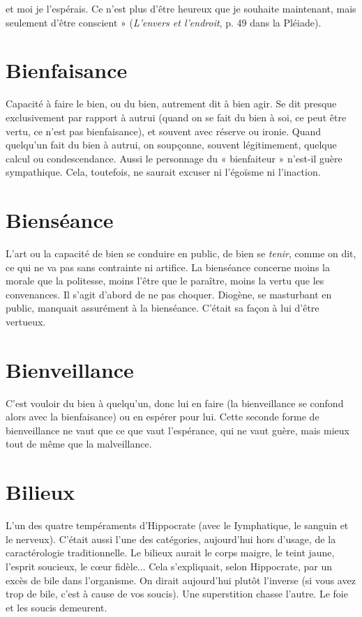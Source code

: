 et moi je l’espérais. Ce n’est plus d’être heureux que je souhaite maintenant,
mais seulement d’être conscient » ({\it L'envers et l'endroit}, p. 49 dans la Pléiade).

\section{Bienfaisance}
Capacité à faire le bien, ou du bien, autrement dit à bien
agir. Se dit presque exclusivement par rapport à autrui
(quand on se fait du bien à soi, ce peut être vertu, ce n’est pas bienfaisance), et
souvent avec réserve ou ironie. Quand quelqu'un fait du bien à autrui, on
soupçonne, souvent légitimement, quelque calcul ou condescendance. Aussi le
personnage du « bienfaiteur » n’est-il guère sympathique. Cela, toutefois, ne
saurait excuser ni l’égoïsme ni l’inaction.

\section{Bienséance}
L’art ou la capacité de bien se conduire en public, de bien se
{\it tenir}, comme on dit, ce qui ne va pas sans contrainte ni artifice.
La bienséance concerne moins la morale que la politesse, moins l’être que
le paraître, moins la vertu que les convenances. Il s’agit d’abord de ne pas choquer.
Diogène, se masturbant en public, manquait assurément à la bienséance.
C'était sa façon à lui d’être vertueux.

\section{Bienveillance}
C'est vouloir du bien à quelqu'un, donc lui en faire (la
bienveillance se confond alors avec la bienfaisance) ou en
espérer pour lui. Cette seconde forme de bienveillance ne vaut que ce que vaut
l'espérance, qui ne vaut guère, mais mieux tout de même que la malveillance.

\section{Bilieux}
L'un des quatre tempéraments d’Hippocrate (avec le Iymphatique,
le sanguin et le nerveux). C'était aussi l’une des catégories,
aujourd’hui hors d’usage, de la caractérologie traditionnelle. Le bilieux aurait le
corps maigre, le teint jaune, l'esprit soucieux, le cœur fidèle... Cela s’expliquait,
selon Hippocrate, par un excès de bile dans l'organisme. On dirait
aujourd’hui plutôt l'inverse (si vous avez trop de bile, c’est à cause de vos
soucis). Une superstition chasse l’autre. Le foie et les soucis demeurent.

